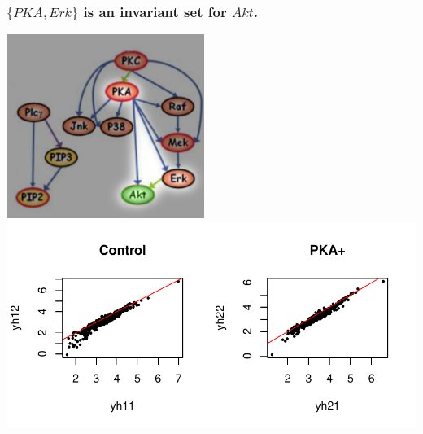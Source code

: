 \documentclass{beamer}
\begin{document}
\begin{frame}
\frametitle{$\{PKA, Erk\}$ is an invariant set for $Akt$.}
\begin{center}
\includegraphics[scale = 0.3]{../images/fig04_01.png}\hspace{0.5in}
\includegraphics[scale = 0.6]{../images/plot04_01.pdf}
\end{center}
\end{frame}
\end{document}
